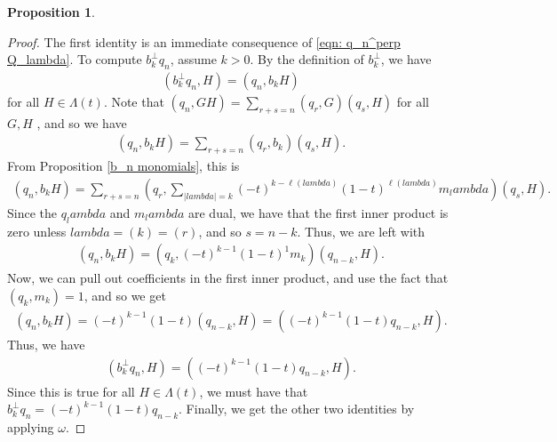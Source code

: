 \documentclass[12pt]{amsart}%
\def\lambda{lambda}%
\newtheorem{proposition}[theorem]{Proposition}
\theoremstyle{remark}
\theoremstyle{definition}
\begin{document}
\begin{proposition}
    \end{proposition}

    \begin{proof}
        The first identity is an immediate consequence of \eqref{eqn: q_n^perp Q_lambda}. To compute $b_k^\perp q_n$, assume $k>0$. By the definition of $b_k^\perp$, we have
        \begin{align*}
            (b_k^\perp q_n,H)=(q_n,b_k H)
        \end{align*}
        for all $H\in\Lambda(t)$. Note that $(q_n,GH)=\sum_{r+s=n}(q_r,G)(q_s,H)$ for all $G,H$ \cite[p.~236]{macdonald:1995}, and so we have
        \begin{align*}
            (q_n,b_k H)=\sum_{r+s=n}(q_r,b_k)(q_s,H).
        \end{align*}
        From Proposition \ref{b_n monomials}, this is
        \begin{align*}
            (q_n,b_k H)=\sum_{r+s=n}\left(q_r,\sum_{|\lambda|=k}(-t)^{k-\ell(\lambda)}(1-t)^{\ell(\lambda)}m_\lambda\right)(q_s,H).
        \end{align*}
        Since the $q_\lambda$ and $m_\lambda$ are dual, we have that the first inner product is zero unless $\lambda=(k)=(r)$, and so $s=n-k$. Thus, we are left with
        \begin{align*}
            (q_n,b_k H)=(q_k,(-t)^{k-1}(1-t)^1m_k)(q_{n-k},H).
        \end{align*}
        Now, we can pull out coefficients in the first inner product, and use the fact that $(q_k,m_k)=1$, and so we get
        \begin{align*}
            (q_n,b_k H)=(-t)^{k-1}(1-t)(q_{n-k},H)=((-t)^{k-1}(1-t)q_{n-k},H).
        \end{align*}
        Thus, we have
        \begin{align*}
            (b_k^\perp q_n,H)=((-t)^{k-1}(1-t)q_{n-k},H).
        \end{align*}
        Since this is true for all $H\in\Lambda(t)$, we must have that $b_k^\perp q_n=(-t)^{k-1}(1-t)q_{n-k}$. Finally, we get the other two identities by applying $\omega$.
    \end{proof}
\end{document}

